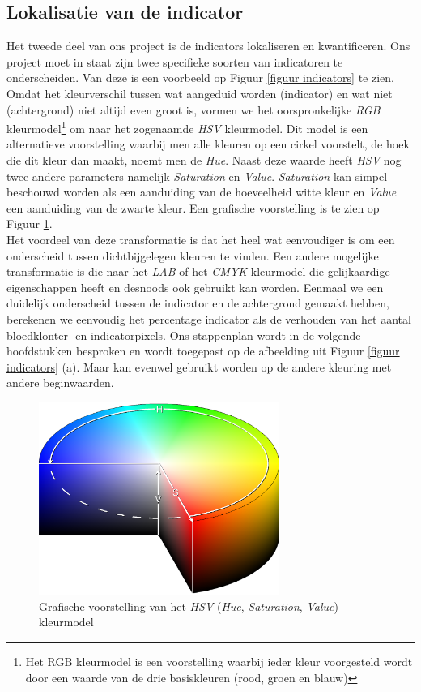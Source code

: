 \documentclass[a4paper,kulak]{kulakarticle}
\begin{document}
\subsection{Lokalisatie van de indicator} \label{lokalisatie_indicator}
Het tweede deel van ons project is de indicators lokaliseren en kwantificeren. Ons project moet in staat zijn twee specifieke soorten van indicatoren te onderscheiden. Van deze is een voorbeeld op Figuur \ref{figuur indicators} te zien. Omdat het kleurverschil tussen wat aangeduid worden (indicator) en wat niet (achtergrond) niet altijd even groot is, vormen we het oorspronkelijke \textit{RGB} kleurmodel\footnote{Het RGB kleurmodel is een voorstelling waarbij ieder kleur voorgesteld wordt door een waarde van de drie basiskleuren (rood, groen en blauw)} om naar het zogenaamde \textit{HSV} kleurmodel. Dit model is een alternatieve voorstelling waarbij men alle kleuren op een cirkel voorstelt, de hoek die dit kleur dan maakt, noemt men de \textit{Hue}. Naast deze waarde heeft \textit{HSV} nog twee andere parameters namelijk \textit{Saturation} en \textit{Value}. \textit{Saturation} kan simpel beschouwd worden als een aanduiding van de hoeveelheid witte kleur en \textit{Value} een aanduiding van de zwarte kleur. Een grafische voorstelling is te zien op Figuur \ref{figuur hsv_schema}.\\
Het voordeel van deze transformatie is dat het heel wat eenvoudiger is om een onderscheid tussen dichtbijgelegen kleuren te vinden. Een andere mogelijke transformatie is die naar het \textit{LAB} of het \textit{CMYK} kleurmodel die gelijkaardige eigenschappen heeft en desnoods ook gebruikt kan worden. Eenmaal we een duidelijk onderscheid tussen de indicator en de achtergrond gemaakt hebben, berekenen we eenvoudig het percentage indicator als de verhouden van het aantal bloedklonter- en indicatorpixels. Ons stappenplan wordt in de volgende hoofdstukken besproken en wordt toegepast op de afbeelding uit Figuur \ref{figuur indicators} (a). Maar kan evenwel gebruikt worden op de andere kleuring met andere beginwaarden.

\begin{figure}[H]
	\centering
	\includegraphics[width=0.7\textwidth]{HSV_vb.png}
	
	\caption{Grafische voorstelling van het \textit{HSV} (\textit{Hue}, \textit{Saturation}, \textit{Value}) kleurmodel}
	\label{figuur hsv_schema}
\end{figure}
\end{document}
